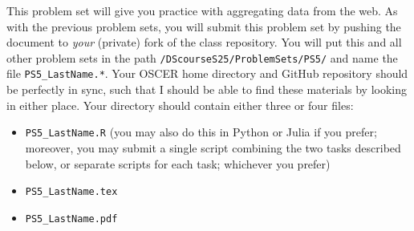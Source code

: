 \documentclass[12pt,english]{exam}
\begin{document}
This problem set will give you practice with aggregating data from the web.
As with the previous problem sets, you will submit this problem set by pushing the document to \emph{your} (private) fork of the class repository. You will put this and all other problem sets in the path \texttt{/DScourseS25/ProblemSets/PS5/} and name the file \texttt{PS5\_LastName.*}. Your OSCER home directory and GitHub repository should be perfectly in sync, such that I should be able to find these materials by looking in either place. Your directory should contain either three or four files:
\begin{itemize}
    \item \texttt{PS5\_LastName.R} (you may also do this in Python or Julia if you prefer; moreover, you may submit a single script combining the two tasks described below, or separate scripts for each task; whichever you prefer)
    \item \texttt{PS5\_LastName.tex}
    \item \texttt{PS5\_LastName.pdf}
\end{itemize}
\end{document}
